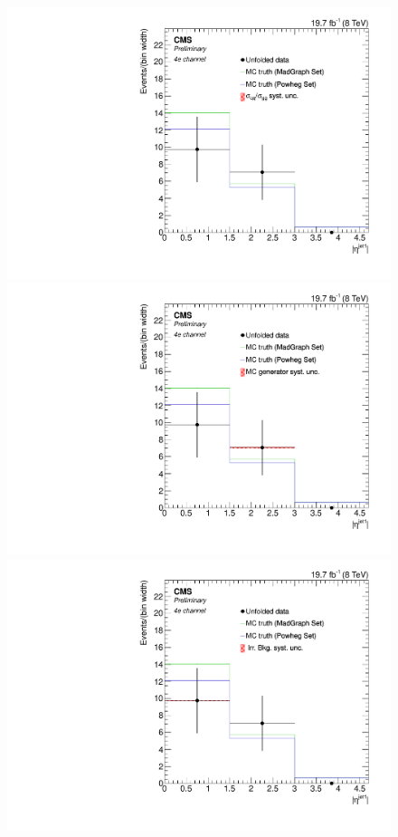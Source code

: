 \begin{figure}[hbtp]
 \begin{center}
   \includegraphics[width=0.8\cmsFigWidth]{Figures/Unfolding/Systematics/ZZTo4e_EtaJet1_qqgg_Mad_fr}     
   \includegraphics[width=0.8\cmsFigWidth]{Figures/Unfolding/Systematics/ZZTo4e_EtaJet1_MCgen_Mad_fr}     
   \includegraphics[width=0.8\cmsFigWidth]{Figures/Unfolding/Systematics/ZZTo4e_EtaJet1_IrrBkg_Mad_fr}

\end{center}
\end{figure}

